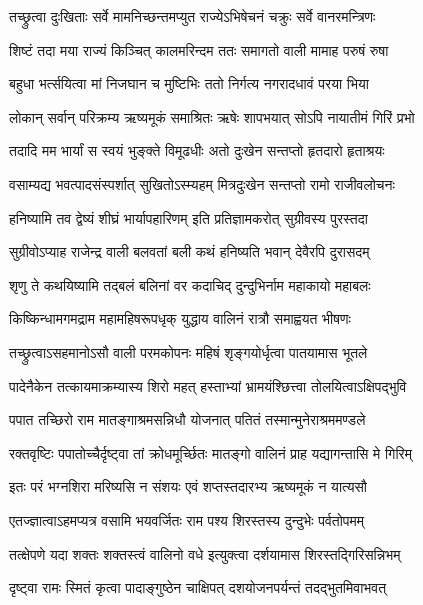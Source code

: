 \twolineshloka
{तच्छ्रुत्वा दुःखिताः सर्वे मामनिच्छन्तमप्युत}
{राज्येऽभिषेचनं चक्रुः सर्वे वानरमन्त्रिणः} %

\twolineshloka
{शिष्टं तदा मया राज्यं किञ्चित् कालमरिन्दम}
{ततः समागतो वाली मामाह परुषं रुषा} %

\twolineshloka
{बहुधा भर्त्सयित्वा मां निजघान च मुष्टिभिः}
{ततो निर्गत्य नगरादधावं परया भिया} %

\twolineshloka
{लोकान् सर्वान् परिक्रम्य ऋष्यमूकं समाश्रितः}
{ऋषेः शापभयात् सोऽपि नायातीमं गिरिं प्रभो} %

\twolineshloka
{तदादि मम भार्यां स स्वयं भुङ्क्ते विमूढधीः}
{अतो दुःखेन सन्तप्तो हृतदारो हृताश्रयः} %

\twolineshloka
{वसाम्यद्य भवत्पादसंस्पर्शात् सुखितोऽस्म्यहम्}
{मित्रदुःखेन सन्तप्तो रामो राजीवलोचनः} %

\twolineshloka
{हनिष्यामि तव द्वेष्यं शीघ्रं भार्यापहारिणम्}
{इति प्रतिज्ञामकरोत् सुग्रीवस्य पुरस्तदा} %

\twolineshloka
{सुग्रीवोऽप्याह राजेन्द्र वाली बलवतां बली}
{कथं हनिष्यति भवान् देवैरपि दुरासदम्} %

\twolineshloka
{शृणु ते कथयिष्यामि तद्बलं बलिनां वर}
{कदाचिद् दुन्दुभिर्नाम महाकायो महाबलः} %

\twolineshloka
{किष्किन्धामगमद्राम महामहिषरूपधृक्}
{युद्धाय वालिनं रात्रौ समाह्वयत भीषणः} %

\twolineshloka
{तच्छ्रुत्वाऽसहमानोऽसौ वाली परमकोपनः}
{महिषं शृङ्गयोर्धृत्वा पातयामास भूतले} %

\twolineshloka
{पादेनैकेन तत्कायमाक्रम्यास्य शिरो महत्}
{हस्ताभ्यां भ्रामयंश्छित्त्वा तोलयित्वाऽक्षिपद्भुवि} %

\twolineshloka
{पपात तच्छिरो राम मातङ्गाश्रमसन्निधौ}
{योजनात् पतितं तस्मान्मुनेराश्रममण्डले} %

\twolineshloka
{रक्तवृष्टिः पपातोच्चैर्दृष्ट्वा तां क्रोधमूर्च्छितः}
{मातङ्गो वालिनं प्राह यद्यागन्तासि मे गिरिम्} %

\twolineshloka
{इतः परं भग्नशिरा मरिष्यसि न संशयः}
{एवं शप्तस्तदारभ्य ऋष्यमूकं न यात्यसौ} %

\twolineshloka
{एतज्ज्ञात्वाऽहमप्यत्र वसामि भयवर्जितः}
{राम पश्य शिरस्तस्य दुन्दुभेः पर्वतोपमम्} %

\twolineshloka
{तत्क्षेपणे यदा शक्तः शक्तस्त्वं वालिनो वधे}
{इत्युक्त्वा दर्शयामास शिरस्तद्गिरिसन्निभम्} %

\twolineshloka
{दृष्ट्वा रामः स्मितं कृत्वा पादाङ्गुष्ठेन चाक्षिपत्}
{दशयोजनपर्यन्तं तदद्भुतमिवाभवत्} %

